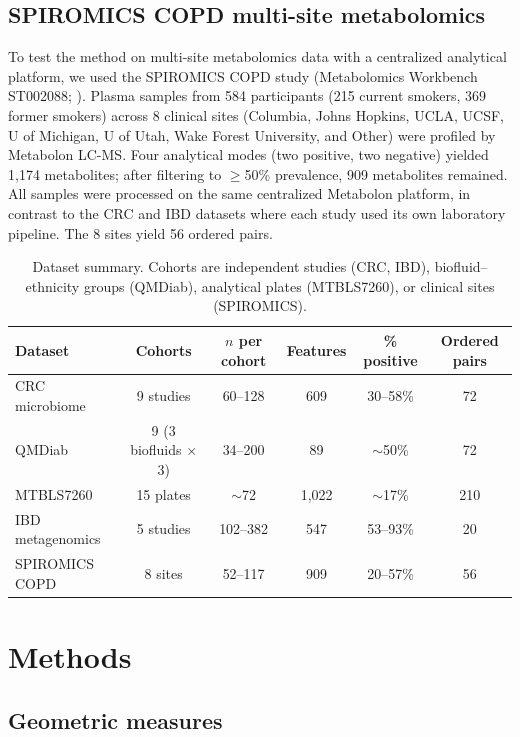 \documentclass{article}
\begin{document}
\subsection{SPIROMICS COPD multi-site metabolomics}
\label{sec:copd_data}

To test the method on multi-site metabolomics data with a centralized analytical platform, we used the SPIROMICS COPD study (Metabolomics Workbench ST002088; \citealp{bowler2017spiromics}). Plasma samples from 584 participants (215 current smokers, 369 former smokers) across 8 clinical sites (Columbia, Johns Hopkins, UCLA, UCSF, U of Michigan, U of Utah, Wake Forest University, and Other) were profiled by Metabolon LC-MS. Four analytical modes (two positive, two negative) yielded 1{,}174 metabolites; after filtering to $\geq$50\% prevalence, 909 metabolites remained. All samples were processed on the same centralized Metabolon platform, in contrast to the CRC and IBD datasets where each study used its own laboratory pipeline. The 8 sites yield 56 ordered pairs.

\begin{table}[t]
\centering
\caption{Dataset summary. Cohorts are independent studies (CRC, IBD), biofluid--ethnicity groups (QMDiab), analytical plates (MTBLS7260), or clinical sites (SPIROMICS).}
\label{tab:cohorts}
\begin{tabular}{lccccc}
\toprule
Dataset & Cohorts & $n$ per cohort & Features & \% positive & Ordered pairs \\
\midrule
CRC microbiome & 9 studies & 60--128 & 609 & 30--58\% & 72 \\
QMDiab & 9 (3 biofluids $\times$ 3) & 34--200 & 89 & $\sim$50\% & 72 \\
MTBLS7260 & 15 plates & $\sim$72 & 1{,}022 & $\sim$17\% & 210 \\
IBD metagenomics & 5 studies & 102--382 & 547 & 53--93\% & 20 \\
SPIROMICS COPD & 8 sites & 52--117 & 909 & 20--57\% & 56 \\
\bottomrule
\end{tabular}
\end{table}


\section{Methods}
\label{sec:methods}

\subsection{Geometric measures}
\end{document}
